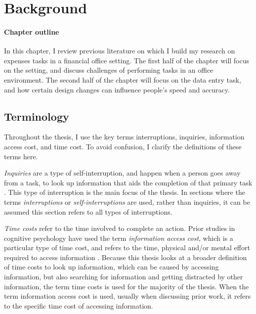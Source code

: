 \chapter{Background}\label{ch:Background}

\begin{mynote}
\subsubsection{Chapter outline}
In this chapter, I review previous literature on which I build my research on expenses tasks in a financial office setting. The first half of the chapter will focus on the setting, and discuss challenges of performing tasks in an office environment. The second half of the chapter will focus on the data entry task, and how certain design changes can influence people's speed and accuracy. 
\end{mynote}

\section{Terminology}
Throughout the thesis, I use the key terms interruptions, inquiries, information access cost, and time cost. To avoid confusion, I clarify the definitions of these terms here.

\textit{Inquiries} are a type of self-interruption, and happen when a person goes away from a task, to look up information that aids the completion of that primary task \citep{Jin2009}. This type of interruption is the main focus of the thesis. In sections where the terms \textit{interruptions} or \textit{self-interruptions} are used, rather than inquiries, it can be assumed this section refers to all types of interruptions. 

\textit{Time costs} refer to the time involved to complete an action. Prior studies in cognitive psychology have used the term \textit{information access cost}, which  is a particular type of time cost, and refers to the time, physical and/or mental effort required to access information \citep{Gray2006}. Because this thesis looks at a broader definition of time costs to look up information, which can be caused by accessing information, but also searching for information and getting distracted by other information, the term time costs is used for the majority of the thesis. When the term information access cost is used, usually when discussing prior work, it refers to the specific time cost of accessing information. 

